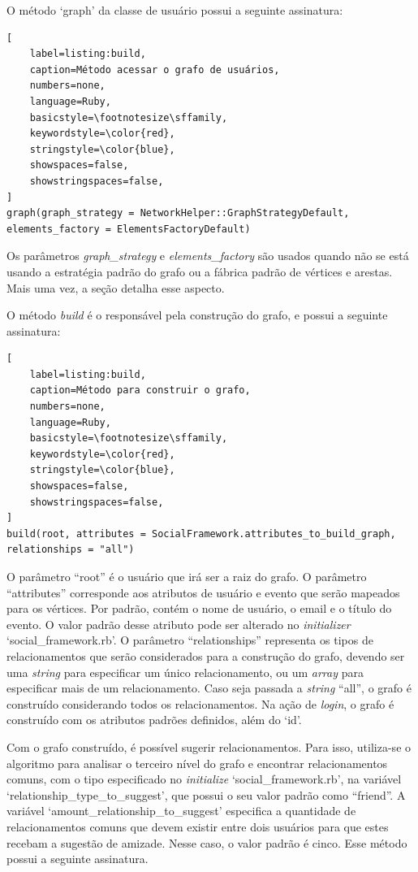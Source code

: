O método `graph' da classe de usuário possui a seguinte assinatura:

\begin{lstlisting}[
    label=listing:build,
    caption=Método acessar o grafo de usuários,
    numbers=none,
    language=Ruby,
    basicstyle=\footnotesize\sffamily,
    keywordstyle=\color{red},
    stringstyle=\color{blue},
    showspaces=false,
    showstringspaces=false,
]
graph(graph_strategy = NetworkHelper::GraphStrategyDefault, elements_factory = ElementsFactoryDefault)
\end{lstlisting}

Os parâmetros \textit{graph\_strategy} e \textit{elements\_factory} são usados quando não se está usando a estratégia padrão do grafo ou a fábrica padrão de vértices e arestas. Mais uma vez, a seção  detalha esse aspecto.

O método \textit{build} é o responsável pela construção do grafo, e possui a seguinte assinatura:

\begin{lstlisting}[
    label=listing:build,
    caption=Método para construir o grafo,
    numbers=none,
    language=Ruby,
    basicstyle=\footnotesize\sffamily,
    keywordstyle=\color{red},
    stringstyle=\color{blue},
    showspaces=false,
    showstringspaces=false,
]
build(root, attributes = SocialFramework.attributes_to_build_graph, relationships = "all")
\end{lstlisting}

O parâmetro ``root'' é o usuário que irá ser a raiz do grafo. O parâmetro ``attributes'' corresponde aos atributos de usuário e evento que serão mapeados para os vértices. Por padrão, contém o nome de usuário, o email e o título do evento. O valor padrão desse atributo pode ser alterado no \textit{initializer} `social\_framework.rb'. O parâmetro ``relationships'' representa os tipos de relacionamentos que serão considerados para a construção do grafo, devendo ser uma \textit{string} para especificar um único relacionamento, ou um \textit{array} para especificar mais de um relacionamento. Caso seja passada a \textit{string} ``all'', o grafo é construído considerando todos os relacionamentos. Na ação de \textit{login}, o grafo é construído com os atributos padrões definidos, além do `id'.

Com o grafo construído, é possível sugerir relacionamentos. Para isso, utiliza-se o algoritmo  para analisar o terceiro nível do grafo e encontrar relacionamentos comuns, com o tipo especificado no \textit{initialize} `social\_framework.rb', na variável `relationship\_type\_to\_suggest', que possui o seu valor padrão como ``friend''. A variável `amount\_relationship\_to\_suggest' especifica a quantidade de relacionamentos comuns que devem existir entre dois usuários para que estes recebam a sugestão de amizade. Nesse caso, o valor padrão é cinco. Esse método possui a seguinte assinatura.


